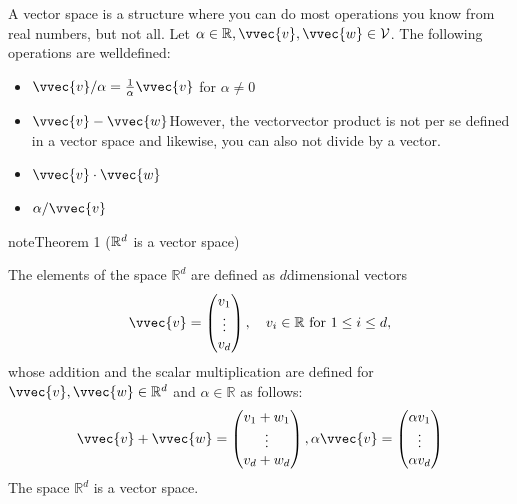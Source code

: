 \documentclass[letterpaper,10pt,english]{jupyterBook}
\begin{document}
\sphinxAtStartPar
A vector space is a structure where you can do most operations you know from real numbers, but not all. Let \(\alpha\in\mathbb{R}, \vvec{v},\vvec{w}\in\mathcal{V}\). The following operations are well\sphinxhyphen{}defined:
\begin{itemize}
\item {} 
\sphinxAtStartPar
\(\vvec{v}/\alpha = \frac1\alpha \vvec{v}\) for \(\alpha\neq 0\)

\item {} 
\sphinxAtStartPar
\(\vvec{v}-\vvec{w}\)However, the vector\sphinxhyphen{}vector product is not per se defined in a vector space and likewise, you can also not divide by a vector.

\item {} 
\sphinxAtStartPar
\(\vvec{v}\cdot \vvec{w}\)

\item {} 
\sphinxAtStartPar
\(\alpha/\vvec{v}\)

\end{itemize}
\label{linalg_spaces:theorem-1}
\begin{sphinxadmonition}{note}{Theorem 1 (\protect\(\mathbb{R}^d\protect\) is a vector space)}



\sphinxAtStartPar
The elements of the space \(\mathbb{R}^d\) are defined as \(d\)\sphinxhyphen{}dimensional vectors
\begin{equation*}
\begin{split}\vvec{v} = \begin{pmatrix}v_1\\\vdots\\v_d\end{pmatrix},\quad v_i\in\mathbb{R} \text{ for } 1\leq i \leq d, \end{split}
\end{equation*}
whose addition and the scalar multiplication are defined for \(\vvec{v},\vvec{w}\in\mathbb{R}^d\) and \(\alpha\in\mathbb{R}\) as follows:
\begin{align*}
    \vvec{v}+\vvec{w} = \begin{pmatrix}v_1+w_1\\\vdots\\v_d+w_d\end{pmatrix},
    \alpha\vvec{v} = \begin{pmatrix}\alpha v_1\\\vdots\\\alpha v_d\end{pmatrix} 
\end{align*}
\sphinxAtStartPar
The space \(\mathbb{R}^d\) is a vector space.
\end{sphinxadmonition}
\end{document}
